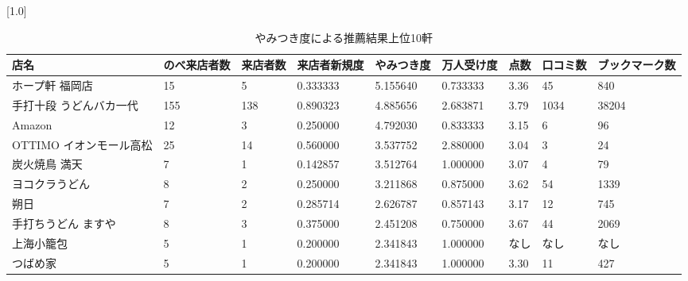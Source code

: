 \begin{table}[H]
\caption{やみつき度による推薦結果上位10軒}
\label{table::addictibity}
\small
\scalebox{0.7}[1.0]{
\begin{tabular}{|l|l|l|l|l|l|l|l|l|}
\hline
店名              & のべ来店者数 & 来店者数 & 来店者新規度   & やみつき度    & 万人受け度    & 点数    & 口コミ数  & ブックマーク数 \\ \hline
ホープ軒 福岡店        & 15     & 5    & 0.333333 & 5.155640 & 0.733333 & 3.36  & 45    & 840     \\ \hline
手打十段 うどんバカ一代    & 155    & 138  & 0.890323 & 4.885656 & 2.683871 & 3.79  & 1034  & 38204   \\ \hline
Amazon          & 12     & 3    & 0.250000 & 4.792030 & 0.833333 & 3.15  & 6     & 96      \\ \hline
OTTIMO イオンモール高松 & 25     & 14   & 0.560000 & 3.537752 & 2.880000 & 3.04  & 3     & 24      \\ \hline
炭火焼鳥 満天         & 7      & 1    & 0.142857 & 3.512764 & 1.000000 & 3.07  & 4     & 79      \\ \hline
ヨコクラうどん         & 8      & 2    & 0.250000 & 3.211868 & 0.875000 & 3.62  & 54    & 1339    \\ \hline
朔日              & 7      & 2    & 0.285714 & 2.626787 & 0.857143 & 3.17  & 12    & 745     \\ \hline
手打ちうどん ますや      & 8      & 3    & 0.375000 & 2.451208 & 0.750000 & 3.67  & 44    & 2069    \\ \hline
上海小籠包           & 5      & 1    & 0.200000 & 2.341843 & 1.000000 & なし & なし & なし   \\ \hline
つばめ家            & 5      & 1    & 0.200000 & 2.341843 & 1.000000 & 3.30  & 11    & 427     \\ \hline
\end{tabular}
}
\end{table}
